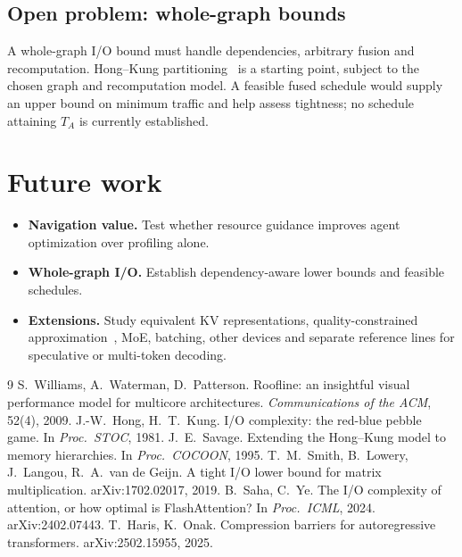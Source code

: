 \documentclass[11pt]{article}
\theoremstyle{definition}
\theoremstyle{remark}
\begin{document}
\subsection{Open problem: whole-graph bounds}\label{sec:notproved}\label{sec:wholegraph}
A whole-graph I/O bound must handle dependencies, arbitrary fusion and recomputation.
Hong--Kung partitioning~\cite{hongkung} is a starting point, subject to the chosen graph and
recomputation model. A feasible fused schedule would supply an upper bound on minimum traffic and
help assess tightness; no schedule attaining $T_A$ is currently established.

\section{Future work}\label{sec:future}
\begin{itemize}[nosep]
\item \textbf{Navigation value.} Test whether resource guidance improves agent optimization over profiling alone.
\item \textbf{Whole-graph I/O.} Establish dependency-aware lower bounds and feasible schedules.
\item \textbf{Extensions.} Study equivalent KV representations, quality-constrained approximation~\cite{harisonak},
MoE, batching, other devices and separate reference lines for speculative or multi-token decoding.
\end{itemize}

\begin{thebibliography}{9}
 S.~Williams, A.~Waterman, D.~Patterson. Roofline: an insightful visual performance
  model for multicore architectures. \emph{Communications of the ACM}, 52(4), 2009.
 J.-W.~Hong, H.~T.~Kung. I/O complexity: the red-blue pebble game. In \emph{Proc.\ STOC},
  1981.
 J.~E.~Savage. Extending the Hong--Kung model to memory hierarchies. In \emph{Proc.\
  COCOON}, 1995.
 T.~M.~Smith, B.~Lowery, J.~Langou, R.~A.~van de Geijn. A tight I/O lower bound for
  matrix multiplication. arXiv:1702.02017, 2019.
 B.~Saha, C.~Ye. The I/O complexity of attention, or how optimal is FlashAttention?
  In \emph{Proc.\ ICML}, 2024. arXiv:2402.07443.
 T.~Haris, K.~Onak. Compression barriers for autoregressive transformers.
  arXiv:2502.15955, 2025.
\end{thebibliography}
\end{document}
